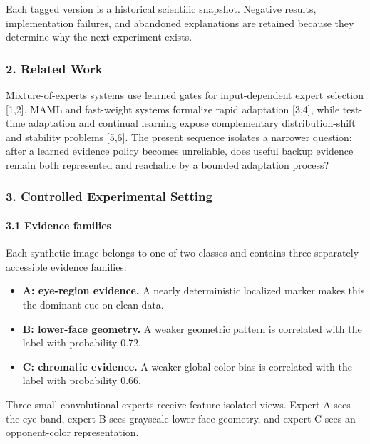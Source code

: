 \documentclass[
  10pt,
]{article}
\providecommand{\tightlist}{%
  \setlength{\itemsep}{0pt}\setlength{\parskip}{0pt}}
\begin{document}
Each tagged version is a historical scientific snapshot. Negative
results, implementation failures, and abandoned explanations are
retained because they determine why the next experiment exists.

\hypertarget{related-work}{%
\subsubsection{2. Related Work}\label{related-work}}

Mixture-of-experts systems use learned gates for input-dependent expert
selection {[}1,2{]}. MAML and fast-weight systems formalize rapid
adaptation {[}3,4{]}, while test-time adaptation and continual learning
expose complementary distribution-shift and stability problems
{[}5,6{]}. The present sequence isolates a narrower question: after a
learned evidence policy becomes unreliable, does useful backup evidence
remain both represented and reachable by a bounded adaptation process?

\hypertarget{controlled-experimental-setting}{%
\subsubsection{3. Controlled Experimental
Setting}\label{controlled-experimental-setting}}

\hypertarget{evidence-families}{%
\paragraph{3.1 Evidence families}\label{evidence-families}}

Each synthetic image belongs to one of two classes and contains three
separately accessible evidence families:

\begin{itemize}
\tightlist
\item
  \textbf{A: eye-region evidence.} A nearly deterministic localized
  marker makes this the dominant cue on clean data.
\item
  \textbf{B: lower-face geometry.} A weaker geometric pattern is
  correlated with the label with probability 0.72.
\item
  \textbf{C: chromatic evidence.} A weaker global color bias is
  correlated with the label with probability 0.66.
\end{itemize}

Three small convolutional experts receive feature-isolated views. Expert
A sees the eye band, expert B sees grayscale lower-face geometry, and
expert C sees an opponent-color representation.
\end{document}
